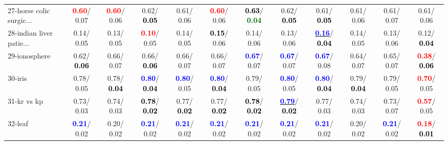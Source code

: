\begin{table}[h]
\begin{center}
{\begin{tabular}{lc|c|c|c|c|c|c|c|c|c|c}
27-horse colic surgic... & \textcolor{red}{\textbf{  0.60}}/  0.07 & \textcolor{red}{\textbf{  0.60}}/  0.06 &   0.62/\textcolor{black}{\textbf{  0.05}} &   0.61/  0.06 & \textcolor{red}{\textbf{  0.60}}/  0.06 & \textcolor{black}{\textbf{  0.63}}/\textcolor{darkgreen}{\textbf{  0.04}} &   0.62/\textcolor{black}{\textbf{  0.05}} &   0.61/\textcolor{black}{\textbf{  0.05}} &   0.61/  0.06 &   0.61/  0.07 &   0.61/  0.06 \\
28-indian liver patie... &   0.14/  0.05 &   0.13/  0.05 & \textcolor{red}{\textbf{  0.10}}/  0.05 &   0.14/  0.05 & \textcolor{black}{\textbf{  0.15}}/  0.06 &   0.14/  0.06 &   0.13/  0.06 & \underline{\textcolor{blue}{\textbf{  0.16}}}/\textcolor{black}{\textbf{  0.04}} &   0.14/  0.05 &   0.13/  0.06 &   0.12/\textcolor{black}{\textbf{  0.04}} \\ \hline
29-ionosphere &   0.62/\textcolor{black}{\textbf{  0.06}} &   0.66/  0.07 &   0.66/\textcolor{black}{\textbf{  0.06}} &   0.66/  0.07 &   0.66/  0.07 & \textcolor{blue}{\textbf{  0.67}}/  0.07 & \textcolor{blue}{\textbf{  0.67}}/  0.07 & \textcolor{blue}{\textbf{  0.67}}/  0.08 &   0.64/  0.07 &   0.65/  0.07 & \textcolor{red}{\textbf{  0.38}}/\textcolor{black}{\textbf{  0.06}} \\
30-iris &   0.78/  0.05 &   0.78/\textcolor{black}{\textbf{  0.04}} & \textcolor{blue}{\textbf{  0.80}}/\textcolor{black}{\textbf{  0.04}} & \textcolor{blue}{\textbf{  0.80}}/  0.05 & \textcolor{blue}{\textbf{  0.80}}/\textcolor{black}{\textbf{  0.04}} &   0.79/  0.05 & \textcolor{blue}{\textbf{  0.80}}/  0.05 & \textcolor{blue}{\textbf{  0.80}}/\textcolor{black}{\textbf{  0.04}} &   0.79/\textcolor{black}{\textbf{  0.04}} &   0.79/  0.05 & \textcolor{red}{\textbf{  0.70}}/  0.05 \\
31-kr vs kp &   0.73/  0.03 &   0.74/  0.03 & \textcolor{black}{\textbf{  0.78}}/\textcolor{black}{\textbf{  0.02}} &   0.77/\textcolor{black}{\textbf{  0.02}} &   0.77/\textcolor{black}{\textbf{  0.02}} & \textcolor{black}{\textbf{  0.78}}/\textcolor{black}{\textbf{  0.02}} & \underline{\textcolor{blue}{\textbf{  0.79}}}/\textcolor{black}{\textbf{  0.02}} &   0.77/  0.03 &   0.74/  0.03 &   0.73/  0.07 & \textcolor{red}{\textbf{  0.57}}/  0.05 \\
32-leaf & \textcolor{blue}{\textbf{  0.21}}/  0.02 &   0.20/  0.02 & \textcolor{blue}{\textbf{  0.21}}/  0.02 & \textcolor{blue}{\textbf{  0.21}}/  0.02 & \textcolor{blue}{\textbf{  0.21}}/  0.02 & \textcolor{blue}{\textbf{  0.21}}/  0.02 & \textcolor{blue}{\textbf{  0.21}}/  0.02 & \textcolor{blue}{\textbf{  0.21}}/  0.02 &   0.20/  0.02 & \textcolor{blue}{\textbf{  0.21}}/  0.02 & \textcolor{red}{\textbf{  0.18}}/\textcolor{black}{\textbf{  0.01}} \\\end{tabular}}\label{stratsALCKappa0aC4.5wRedux}
\end{center}
\end{table}

